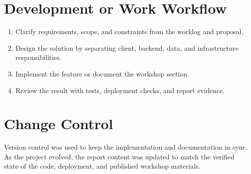 \section{Development or Work Workflow}

\begin{enumerate}
  \item Clarify requirements, scope, and constraints from the worklog and
  proposal.
  \item Design the solution by separating client, backend, data, and
  infrastructure responsibilities.
  \item Implement the feature or document the workshop section.
  \item Review the result with tests, deployment checks, and report evidence.
\end{enumerate}

\section{Change Control}

Version control was used to keep the implementation and documentation in sync.
As the project evolved, the report content was updated to match the verified
state of the code, deployment, and published workshop materials.